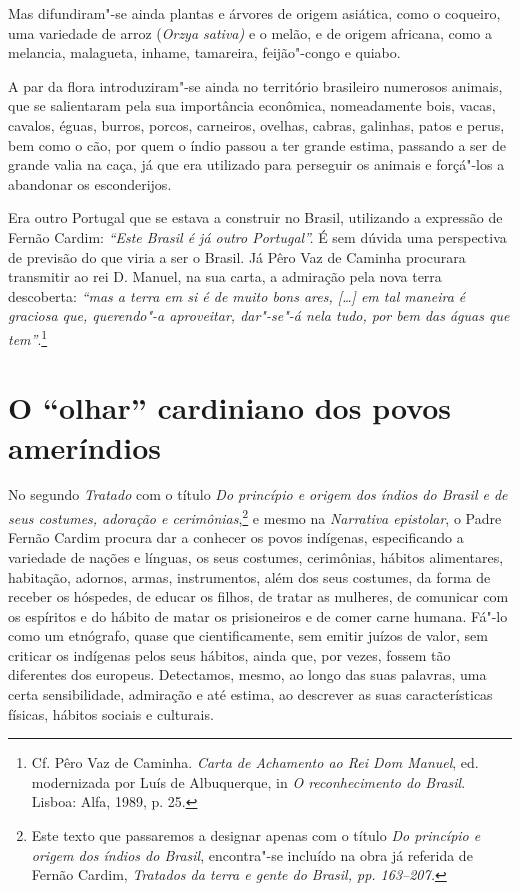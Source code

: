 Mas difundiram"-se ainda plantas e árvores de origem asiática, como o
coqueiro, uma variedade de arroz (\textit{Orzya sativa)} e o melão, e de
origem africana, como a melancia, malagueta, inhame, tamareira,
feijão"-congo e quiabo.

A par da flora introduziram"-se ainda no território brasileiro
numerosos animais, que se salientaram pela sua importância econômica,
nomeadamente bois, vacas, cavalos, éguas, burros, porcos, carneiros,
ovelhas, cabras, galinhas, patos e perus, bem como o cão, por quem o
índio passou a ter grande estima, passando a ser de grande valia na
caça, já que era utilizado para perseguir os animais e forçá"-los a
abandonar os esconderijos.

Era outro Portugal que se estava a construir no Brasil, utilizando a
expressão de Fernão Cardim: \textit{``Este Brasil é já outro Portugal''.} 
É sem dúvida uma perspectiva de previsão do que viria a ser o Brasil.
Já Pêro Vaz de Caminha procurara transmitir ao rei D. Manuel, na sua
carta, a admiração pela nova terra descoberta: \textit{``mas a
terra em si é de muito bons ares, [\ldots{}] em tal maneira é graciosa que,
querendo"-a aproveitar, dar"-se"-á nela tudo, por bem das águas que
tem''}.\footnote{ Cf. Pêro Vaz de Caminha. \textit{Carta de
Achamento ao Rei Dom Manuel}, ed. modernizada por Luís de Albuquerque,
in \textit{O reconhecimento do Brasil}. Lisboa: Alfa, 1989, p. 25.} 

\section{O ``olhar'' cardiniano dos povos ameríndios} 

 No segundo \textit{Tratado} com o título \textit{Do
princípio e origem dos índios do Brasil e de seus costumes, adoração e
cerimônias},\footnote{ Este texto que passaremos a designar apenas
com o título \textit{Do princípio e origem dos índios do Brasil}, 
encontra"-se incluído na obra já referida de Fernão Cardim,
\textit{Tratados da terra e gente do Brasil, pp. 163--207.}} e mesmo na
\textit{Narrativa epistolar}, o Padre Fernão Cardim procura dar a
conhecer os povos indígenas, especificando a variedade de nações e
línguas, os seus costumes, cerimônias, hábitos alimentares, habitação,
adornos, armas, instrumentos, além dos seus costumes, da forma
de receber os hóspedes, de educar os filhos, de tratar as mulheres, de
comunicar com os espíritos e do hábito de matar os prisioneiros e de
comer carne humana. Fá"-lo como um etnógrafo, quase que
cientificamente, sem emitir juízos de valor, sem criticar os indígenas
pelos seus hábitos, ainda que, por vezes, fossem tão diferentes dos
europeus. Detectamos, mesmo, ao longo das suas palavras, uma certa
sensibilidade, admiração e até estima, ao descrever as suas
características físicas, hábitos sociais e culturais.

